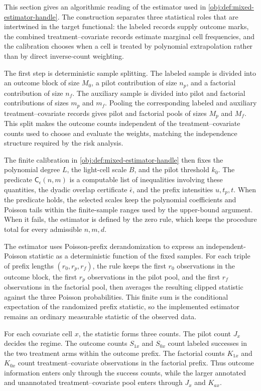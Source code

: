 \documentclass[11pt]{article}
\begin{document}
This section gives an algorithmic reading of the estimator used in \cref{obj:def:mixed-estimator-handle}. The construction separates three statistical roles that are intertwined in the target functional: the labeled records supply outcome marks, the combined treatment--covariate records estimate marginal cell frequencies, and the calibration chooses when a cell is treated by polynomial extrapolation rather than by direct inverse-count weighting.

The first step is deterministic sample splitting. The labeled sample is divided into an outcome block of size \(M_0\), a pilot contribution of size \(n_p\), and a factorial contribution of size \(n_f\). The auxiliary sample is divided into pilot and factorial contributions of sizes \(m_p\) and \(m_f\). Pooling the corresponding labeled and auxiliary treatment--covariate records gives pilot and factorial pools of sizes \(M_p\) and \(M_f\). This split makes the outcome counts independent of the treatment--covariate counts used to choose and evaluate the weights, matching the independence structure required by the risk analysis.

The finite calibration in \cref{obj:def:mixed-estimator-handle} then fixes the polynomial degree \(L\), the light-cell scale \(B\), and the pilot threshold \(k_0\). The predicate \(\mathsf C_\epsilon(n,m)\) is a computable list of inequalities involving these quantities, the dyadic overlap certificate \(\bar\epsilon\), and the prefix intensities \(u,t_p,t\). When the predicate holds, the selected scales keep the polynomial coefficients and Poisson tails within the finite-sample ranges used by the upper-bound argument. When it fails, the estimator is defined by the zero rule, which keeps the procedure total for every admissible \(n,m,d\).

The estimator uses Poisson-prefix derandomization to express an independent-Poisson statistic as a deterministic function of the fixed samples. For each triple of prefix lengths \((r_0,r_p,r_f)\), the rule keeps the first \(r_0\) observations in the outcome block, the first \(r_p\) observations in the pilot pool, and the first \(r_f\) observations in the factorial pool, then averages the resulting clipped statistic against the three Poisson probabilities. This finite sum is the conditional expectation of the randomized prefix statistic, so the implemented estimator remains an ordinary measurable statistic of the observed data.

For each covariate cell \(x\), the statistic forms three counts. The pilot count \(J_x\) decides the regime. The outcome counts \(S_{1x}\) and \(S_{0x}\) count labeled successes in the two treatment arms within the outcome prefix. The factorial counts \(K_{1x}\) and \(K_{0x}\) count treatment--covariate observations in the factorial prefix. Thus outcome information enters only through the success counts, while the larger annotated and unannotated treatment--covariate pool enters through \(J_x\) and \(K_{ax}\).
\end{document}
